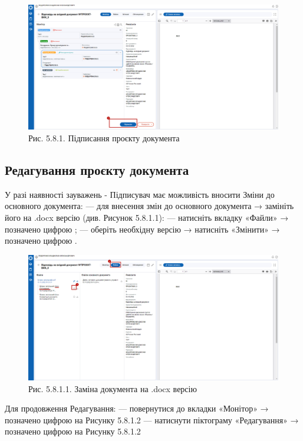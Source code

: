 \begin{figure}[!htbp]
\centerline{\includegraphics[width=\textwidth]{img/5.8.1.png}}
\caption{Рис. 5.8.1. Підписання проєкту документа}
\end{figure}

\subsection{Редагування проєкту документа}

У разі наявності зауважень - Підписувач має можливість вносити Зміни до основного документа:
--- для внесення змін до основного документа → замініть його на .docx версію (див. Рисунок 5.8.1.1):
--- натисніть вкладку «Файли» → позначено цифрою ;
--- оберіть необхідну версію → натисніть «Змінити» → позначено цифрою .

\begin{figure}[!htbp]
\centerline{\includegraphics[width=\textwidth]{img/5.8.1.1.png}}
\caption{Рис. 5.8.1.1. Заміна документа на .docx версію}
\end{figure}

Для продовження Редагування:
--- повернутися до вкладки «Монітор» → позначено цифрою  на Рисунку 5.8.1.2
--- натиснути піктограму «Редагування» → позначено цифрою  на Рисунку 5.8.1.2 

